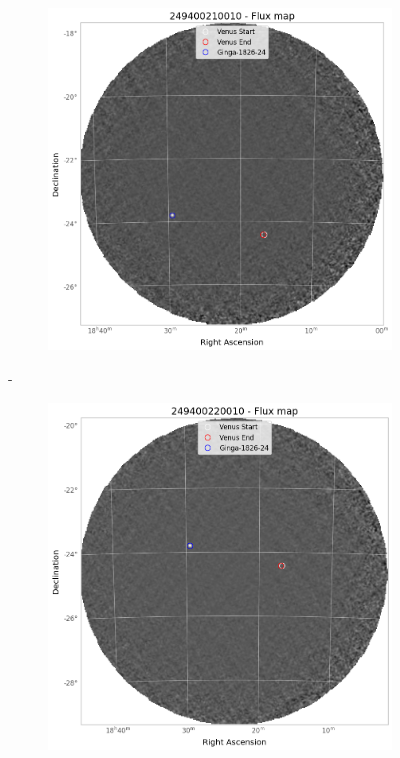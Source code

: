 \begin{figure}[H]
\begin{subfigure}{.3\textwidth}
            \includegraphics[width=\textwidth]{report/Figures/methods/2204/21_map.png}
        \end{subfigure}
        \hspace{1em}-
        \begin{subfigure}{.3\textwidth}
            \centering
            \includegraphics[width=\textwidth]{report/Figures/methods/2204/22_map.png}

\end{subfigure}
\end{figure}
